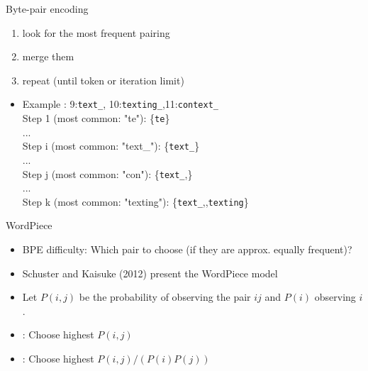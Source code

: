 \documentclass[10pt]{beamer}
\begin{document}
\begin{frame}{Byte-pair encoding}

\begin{enumerate}
    \item look for the most frequent pairing
    \item merge them
    \item repeat (until token or iteration limit)
\end{enumerate}

\begin{itemize}
     \item Example : 9:\texttt{text\_}, 10:\texttt{texting\_},11:\texttt{context\_}\\ \pause \vspace{2mm}
    Step 1 (most common: "te"):
    \{\texttt{te}\} \pause \vspace{2mm} \\
    ... \\
    Step i (most common: "text\_"):
    \{\texttt{text\_}\} \pause \vspace{2mm} \\
    ... \\
    Step j (most common: "con"):
    \{\texttt{text\_},\} \pause \vspace{2mm} \\
    ... \\
    Step k (most common: "texting"):
    \{\texttt{text\_},,\texttt{texting}\} \pause \vspace{2mm} \\

\end{itemize}

\end{frame}


\begin{frame}{WordPiece}

\begin{itemize}
    \item BPE difficulty: Which pair to choose (if they are approx. equally frequent)?
    \pause
    \item Schuster and Kaisuke (2012) present the WordPiece model
    \pause
    \item Let $P(i,j)$ be the probability of observing the pair $ij$ and $P(i)$ observing $i$.
    \pause
    \item {}: Choose highest $P(i,j)$
    \pause
    \item {}: Choose highest $P(i,j)/(P(i)P(j))$
\end{itemize}

\end{frame}
\end{document}
